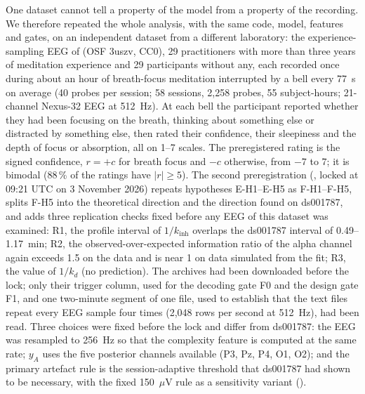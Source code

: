 \documentclass[12pt,a4paper]{article}
\theoremstyle{plain}
\theoremstyle{definition}
\theoremstyle{remark}
\newcommand{\kinh}{k_{\mathrm{inh}}}
\newcommand{\kd}{k_{d}}
\begin{document}
One dataset cannot tell a property of the model from a property of the recording. We therefore repeated the whole analysis, with the same code, model, features and gates, on an independent dataset from a different laboratory: the experience-sampling EEG of \citet{RodriguezLarios2021} (OSF 3uszv, CC0), 29 practitioners with more than three years of meditation experience and 29 participants without any, each recorded once during about an hour of breath-focus meditation interrupted by a bell every 77~s on average (40 probes per session; 58 sessions, 2{,}258 probes, 55 subject-hours; 21-channel Nexus-32 EEG at 512~Hz). At each bell the participant reported whether they had been focusing on the breath, thinking about something else or distracted by something else, then rated their confidence, their sleepiness and the depth of focus or absorption, all on 1--7 scales. The preregistered rating is the signed confidence, $r=+c$ for breath focus and $-c$ otherwise, from $-7$ to $7$; it is bimodal (88\,\% of the ratings have $|r|\ge5$). The second preregistration (, locked at 09:21 UTC on 3 November 2026) repeats hypotheses E-H1--E-H5 as F-H1--F-H5, splits F-H5 into the theoretical direction and the direction found on ds001787, and adds three replication checks fixed before any EEG of this dataset was examined: R1, the profile interval of $1/\kinh$ overlaps the ds001787 interval of 0.49--1.17~min; R2, the observed-over-expected information ratio of the alpha channel again exceeds 1.5 on the data and is near 1 on data simulated from the fit; R3, the value of $1/\kd$ (no prediction). The archives had been downloaded before the lock; only their trigger column, used for the decoding gate F0 and the design gate F1, and one two-minute segment of one file, used to establish that the text files repeat every EEG sample four times (2{,}048 rows per second at 512~Hz), had been read. Three choices were fixed before the lock and differ from ds001787: the EEG was resampled to 256~Hz so that the complexity feature is computed at the same rate; $y_A$ uses the five posterior channels available (P3, Pz, P4, O1, O2); and the primary artefact rule is the session-adaptive threshold that ds001787 had shown to be necessary, with the fixed 150~$\mu$V rule as a sensitivity variant ().
\end{document}
